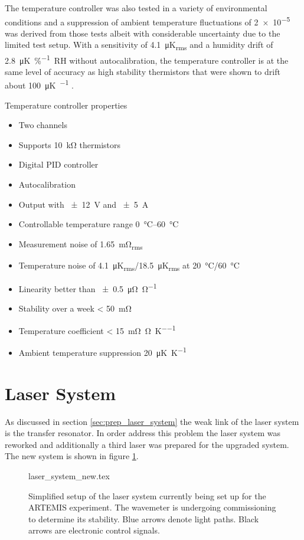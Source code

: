 The temperature controller was also tested in a variety of environmental conditions and a suppression of ambient temperature fluctuations of \num{2e-5} was derived from those tests albeit with considerable uncertainty due to the limited test setup. With a sensitivity of \qty{4.1}{\micro \K_{rms}} and a humidity drift of \qty{2.8}{\micro \K \per \percent RH} without autocalibration, the temperature controller is at the same level of accuracy as high stability thermistors that were shown to drift about \qty{100}{\micro \K \per \year} \cite{tempcontroller_10uK}.
\begin{center}
    \begin{deviceProperties}[label={lst:dgtemp_summary}]{Temperature controller properties}
    \begin{itemize}
        \item Two channels
        \item Supports \qty{10}{\kilo\ohm} thermistors
        \item Digital PID controller
        \item Autocalibration
        \item Output with \qty{\pm 12}{\V} and \qty{\pm 5}{\A}
        \item Controllable temperature range \qtyrange[range-units = single, range-phrase={~to~}]{0}{60}{\celsius}
        \item Measurement noise of \qty{1.65}{\milli\ohm_{rms}}
        \item Temperature noise of \qty{4.1}{\micro\kelvin_{rms}}/\qty{18.5}{\micro\kelvin_{rms}} at \qty{20}{\celsius}/\qty{60}{\celsius}
        \item Linearity better than \qty{\pm 0.5}{\micro \ohm \per \ohm}
        \item Stability over a week \qty{< 50}{\milli \ohm}
        \item Temperature coefficient \qty{< 15}{\milli \ohm \per \ohm \per \kelvin}
        \item Ambient temperature suppression \qty{20}{\micro\K \per \K}
    \end{itemize}
    \end{deviceProperties}
\end{center}

\clearpage
\section{Laser System}%
\label{sec:result_laser_system}
As discussed in section \ref{sec:prep_laser_system} the weak link of the laser system is the transfer resonator. In order address this problem the laser system was reworked and additionally a third laser was prepared for the upgraded system. The new system is shown in figure \ref{fig:laser_system_new}.
\begin{figure}[ht]
    \centering
        {laser_system_new.tex}
    \caption{Simplified setup of the laser system currently being set up for the ARTEMIS experiment. The wavemeter is undergoing commissioning to determine its stability. Blue arrows denote light paths. Black arrows are electronic control signals.}
    \label{fig:laser_system_new}
\end{figure}

